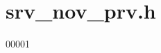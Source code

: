 \hypertarget{a00062_source}{\section{srv\+\_\+nov\+\_\+prv.\+h}
\label{a00062_source}
}

\begin{DoxyCode}
00001  
\end{DoxyCode}
